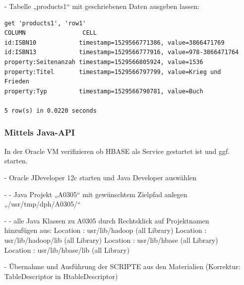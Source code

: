 \begin{itemize}
\item[-] Tabelle „products1“ mit geschriebenen Daten ausgeben lassen:
\begin{lstlisting}
get 'products1', 'row1'
COLUMN                CELL
id:ISBN10            timestamp=1529566771386, value=3866471769
id:ISBN13            timestamp=1529566777916, value=978-3866471764
property:Seitenanzah timestamp=1529566805924, value=1536
property:Titel       timestamp=1529566797799, value=Krieg und Frieden
property:Typ         timestamp=1529566790781, value=Buch

5 row(s) in 0.0220 seconds
\end{lstlisting}

\subsubsection*{Mittels Java-API}
In der Oracle VM verifizieren ob HBASE als Service gestartet ist und ggf. starten.
\item[-]Oracle JDeveloper 12c starten und Java Developer auswählen
\item[-] - Java Projekt „A0305“ mit gewünschtem Zielpfad anlegen „/usr/tmp/dph/A0305/“
\item[-] - alle Java Klassen zu A0305 durch Rechtsklick auf Projektnamen hinzufügen aus:
Location : usr/lib/hadoop (all Library)
Location : usr/lib/hadoop/lib (all Library)
Location : usr/lib/hbase (all Library)
Location : usr/lib/hbase/lib (all Library)
\item[-] Übernahme und Ausführung der SCRIPTE aus den Materialien (Korrektur: TableDescriptor in HtableDescriptor)


\end{itemize}
